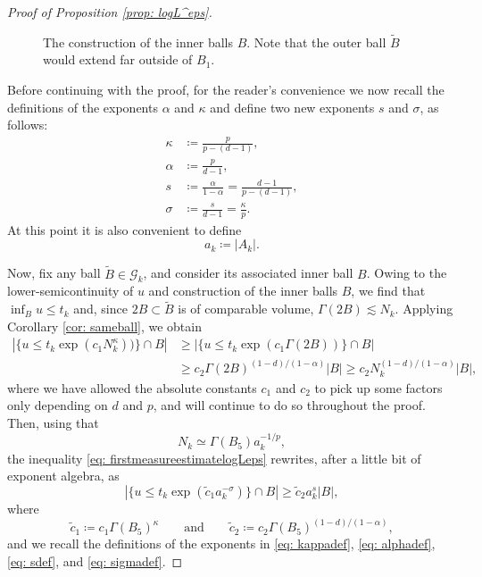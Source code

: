 \documentclass[reqno]{amsart}
\numberwithin{equation}{section}
\numberwithin{equation}{section}
\newcommand{\ds}{\displaystyle}
\begin{document}
\begin{proof}[Proof of Proposition \ref{prop: logL^eps}]
\begin{figure}[t]

    \caption{The construction of the inner balls $B$. Note that the outer ball $\widetilde{B}$ would extend far outside of $B_1$.}
    \label{fig:covering}
\end{figure}

Before continuing with the proof, for the reader's convenience we now recall the definitions of the exponents $\alpha$ and $\kappa$ and define two new exponents $s$ and $\sigma$, as follows:
\begin{align}
    \kappa &\coloneqq \frac{p}{p-(d-1)}, \label{eq: kappadef}
\\
    \alpha & \coloneqq \frac{p}{d-1}, \label{eq: alphadef}\\
    s &\coloneqq \frac{\alpha}{1-\alpha} = \frac{d-1}{p-(d-1)}, \label{eq: sdef}\\
    \sigma &\coloneqq \frac{s}{d-1} = \frac{\kappa}{p} \label{eq: sigmadef}.
\end{align}
At this point it is also convenient to define
$$a_k \coloneqq |A_k|.$$

Now, fix any ball $\widetilde{B} \in \mathcal{G}_k$, and consider its associated inner ball $B$. Owing to the lower-semicontinuity of $u$ and construction of the inner balls $B$, we find that $\ds \inf_{B} u \le t_k$ and, since $2B \subset \widetilde{B}$ is of comparable volume, $\Gamma(2B)\lesssim N_k$. Applying Corollary \ref{cor: sameball}, we obtain
\begin{align} 
\label{eq: firstmeasureestimatelogLeps}
|\{u \le t_k \exp(c_1N_k^\kappa))\} \cap B| & \ge |\{u \le t_k \exp(c_1 \Gamma(2B))\}\cap B|\\
&\ge c_2 \Gamma(2B)^{(1-d)/(1-\alpha)}|B| \ge c_2 N_k^{(1-d)/(1-\alpha)}|B|,
\end{align}
where we have allowed the absolute constants $c_1$ and $c_2$ to pick up some factors only depending on $d$ and $p$, and will continue to do so throughout the proof. Then, using that
$$
N_k \simeq \Gamma(B_5) a_k^{-1/p},
$$
the inequality \eqref{eq: firstmeasureestimatelogLeps} rewrites, after a little bit of exponent algebra, as
$$
|\{u \le t_k \exp(\tilde{c}_1 a_k^{-\sigma})\}\cap B|
\ge
\tilde{c}_2 a_k^s |B|,
$$
where
$$
\tilde{c}_1 \coloneqq c_1 \Gamma(B_5)^\kappa
\qquad\text{and}\qquad
\tilde{c}_2 \coloneqq c_2 \Gamma(B_5)^{(1-d)/(1-\alpha)},$$
and we recall the definitions of the exponents in \eqref{eq: kappadef}, \eqref{eq: alphadef}, \eqref{eq: sdef}, and \eqref{eq: sigmadef}.


\end{proof}
\end{document}
